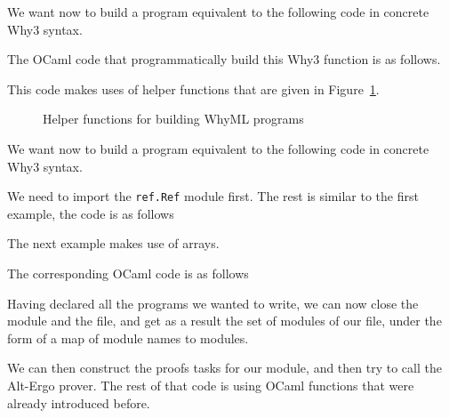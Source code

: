 We want now to build a program equivalent to the following code in concrete Why3 syntax.


The OCaml code that programmatically build this Why3 function is as follows.

This code makes uses of helper functions that are given in Figure~\ref{fig:helpers}.
\begin{figure}[t]
  
  \caption{Helper functions for building WhyML programs}
  \label{fig:helpers}
\end{figure}

We want now to build a program equivalent to the following code in concrete Why3 syntax.

We need to import the \verb|ref.Ref| module first. The rest is similar to the first example, the code is as follows


The next example makes use of arrays.

The corresponding OCaml code is as follows


Having declared all the programs we wanted to write, we can now close
the module and the file, and get as a result the set of modules of our
file, under the form of a map of module names to modules.


We can then construct the proofs tasks for our module, and then try to
call the Alt-Ergo prover. The rest of that code is using OCaml
functions that were already introduced before.


